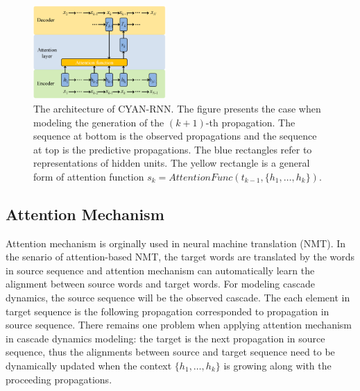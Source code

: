 \begin{figure}[t]
\centering
\includegraphics[width=0.45\textwidth]{figs/cyanrnn_framework.png}
\caption{The architecture of CYAN-RNN. The figure presents the case when
modeling the generation of the $(k+1)$-th propagation. The sequence at bottom is
the observed propagations and the sequence at top is the predictive
propagations. The blue rectangles refer to representations of hidden units.
The yellow rectangle is a general form of attention function
$s_k=\textit{AttentionFunc}(t_{k-1}, \{h_1,\ldots,h_k\})$.}
\label{fig:cyrnn_frame}
\end{figure}

\subsection{Attention Mechanism}
Attention mechanism is orginally used in neural machine translation (NMT).
In the senario of attention-based NMT, the target words are translated by the
words in source sequence and attention mechanism can automatically learn the alignment
between source words and target words.
For modeling cascade dynamics, the source sequence will be the observed
cascade.
The each element in target sequence is the following propagation corresponded to
propagation in source sequence.
There remains one problem when applying attention mechanism in cascade dynamics
modeling: the target is the next propagation in source
sequence, thus the alignments between source and target sequence need to be dynamically updated
when the context $\{h_1,\ldots,h_k\}$ is growing along with the proceeding
propagations.


